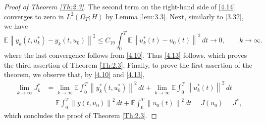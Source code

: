 \documentclass[a4paper,12pt]{article}
\numberwithin{equation}{section}
\begin{document}
\begin{proof}[Proof of Theorem \ref{Th:2.3}]
The second term on the right-hand side of \eqref{4.14} converges to
zero in $L^2(\Omega_T;H)$ by Lemma \ref{lem:3.3}. Next, similarly to \eqref{3.32}, we have  
\[
\mathbb{E}
\left\|
y_k(t,u_k^*)-y_k(t,u_0)
\right\|^2
\leq
C_{19}
\int_0^T
\mathbb{E}
\left\|
u_k^*(t)-u_0(t)
\right\|^2\,dt
\to 0,
\qquad k\to\infty.
\]
where the last convergence follows from \eqref{4.10}. 
Thus \eqref{4.13} follows, which proves the third assertion of Theorem \ref{Th:2.3}.
Finally, to prove the first assertion of the theorem, we observe that, by
\eqref{4.10} and \eqref{4.13},
\[
\begin{aligned}
\lim_{k\to\infty}J_k^*
&=
\lim_{k\to\infty}
\mathbb{E}\int_0^T
\left\|
y_k^*(t,u_k^*)
\right\|^2\,dt
+
\lim_{k\to\infty}
\mathbb{E}\int_0^T
\left\|
u_k^*(t)
\right\|^2\,dt
\\
&=
\mathbb{E}\int_0^T
\left\|
y(t,u_0)
\right\|^2\,dt
+
\mathbb{E}\int_0^T
\left\|
u_0(t)
\right\|^2\,dt =
J(u_0)
=
J^*,
\end{aligned}
\]
which concludes the proof of Theorem \ref{Th:2.3}.
\end{proof}
\end{document}
